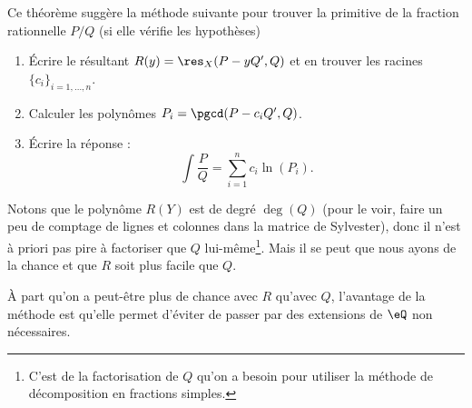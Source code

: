 Ce théorème suggère la méthode suivante pour trouver la primitive de la fraction rationnelle \( P/Q\) (si elle vérifie les hypothèses)
\begin{enumerate}
	\item
	      Écrire le résultant \( R(y)=\res_X(P-yQ',Q)\) et en trouver les racines \( \{ c_i \}_{i=1,\ldots, n}\).
	\item
	      Calculer les polynômes \( P_i=\pgcd(P-c_iQ',Q)\).
	\item
	      Écrire la réponse :
	      \begin{equation}
		      \int\frac{ P }{ Q }=\sum_{i=1}^nc_i\ln(P_i).
	      \end{equation}
\end{enumerate}

Notons que le polynôme \( R(Y)\) est de degré \( \deg(Q)\) (pour le voir, faire un peu de comptage de lignes et colonnes dans la matrice de Sylvester), donc il n'est à priori pas pire à factoriser que \( Q\) lui-même\footnote{C'est de la factorisation de \( Q\) qu'on a besoin pour utiliser la méthode de décomposition en fractions simples.}. Mais il se peut que nous ayons de la chance et que \( R\) soit plus facile que \( Q\).

À part qu'on a peut-être plus de chance avec \( R\) qu'avec \( Q\), l'avantage de la méthode est qu'elle permet d'éviter de passer par des extensions de \( \eQ\) non nécessaires.


